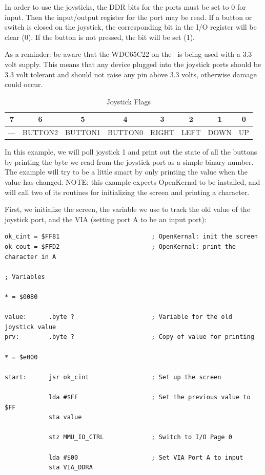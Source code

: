 In order to use the joysticks, the DDR bits for the ports must be set to 0 for input. Then the input/output register for the port may be read. If a button or switch is closed on the joystick, the corresponding bit in the I/O register will be clear (0). If the button is not pressed, the bit will be set (1).

As a reminder: be aware that the WDC65C22 on the \jr\ is being used with a 3.3 volt supply. This means that any device plugged into the joystick ports should be 3.3 volt tolerant and should not raise any pin above 3.3 volts, otherwise damage could occur.

\begin{table}[ht]
    \begin{center}
        \begin{tabular}{|c|c|c|c|c|c|c|c|} \hline
            7 & 6 & 5 & 4 & 3 & 2 & 1 & 0 \\\hline\hline
            --- & BUTTON2 & BUTTON1 & BUTTON0 & RIGHT & LEFT & DOWN & UP \\ \hline
        \end{tabular}
    \end{center}
    \caption{Joystick Flags}
    \label{tab:via_joystick}
\end{table}

In this example, we will poll joystick 1 and print out the state of all the buttons by printing the byte we read from the joystick port as a simple binary number. The example will try to be a little smart by only printing the value when the value has changed. NOTE: this example expects OpenKernal to be installed, and will call two of its routines for initializing the screen and printing a character.

First, we initialize the screen, the variable we use to track the old value of the joystick port, and the VIA (setting port A to be an input port):
\begin{verbatim}
ok_cint = $FF81                         ; OpenKernal: init the screen
ok_cout = $FFD2                         ; OpenKernal: print the character in A

; Variables

* = $0080

value:      .byte ?                     ; Variable for the old joystick value
prv:        .byte ?                     ; Copy of value for printing

* = $e000

start:      jsr ok_cint                 ; Set up the screen

            lda #$FF                    ; Set the previous value to $FF
            sta value

            stz MMU_IO_CTRL             ; Switch to I/O Page 0

            lda #$00                    ; Set VIA Port A to input
            sta VIA_DDRA
\end{verbatim}

